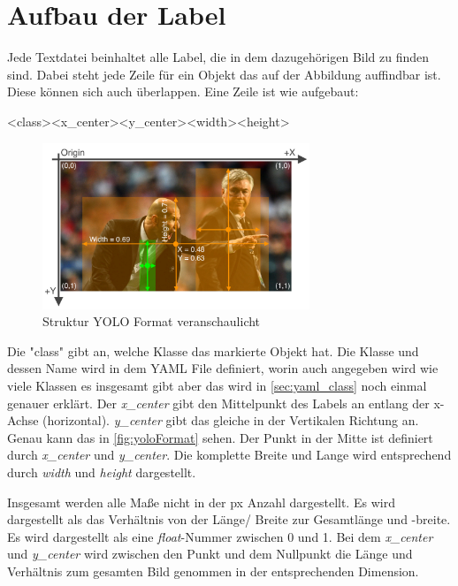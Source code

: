 \section{Aufbau der Label}
Jede Textdatei beinhaltet alle Label, die in dem dazugehörigen Bild zu finden sind. Dabei steht jede Zeile für ein Objekt das auf der Abbildung auffindbar ist. Diese können sich auch überlappen. Eine Zeile ist wie aufgebaut:
\begin{tcolorbox}
    \textless class\textgreater\space \textless x\_center\textgreater \space \textless y\_center\textgreater \space\textless width\textgreater \space\textless height\textgreater 
\end{tcolorbox}
\begin{figure}
    \begin{center}
        \includegraphics[width=8cm]{data/img/yolo_picture_structure.png}    
        \caption{Struktur YOLO Format veranschaulicht}
        \label{fig:yoloFormat}
    \end{center}
\end{figure}
Die "class" gibt an, welche Klasse das markierte Objekt hat. Die Klasse und dessen Name wird in dem YAML File definiert, worin auch angegeben wird wie viele Klassen es insgesamt gibt aber das wird in \autoref{sec:yaml_class} noch einmal genauer erklärt. Der \textit{x\_center} gibt den Mittelpunkt des Labels an entlang der x-Achse (horizontal). \textit{y\_center} gibt das gleiche in der Vertikalen Richtung an. Genau kann das in \autoref{fig:yoloFormat} sehen. Der Punkt in der Mitte ist definiert durch \textit{x\_center} und \textit{y\_center}. Die komplette Breite und Lange wird entsprechend durch \textit{width} und \textit{height} dargestellt. 

Insgesamt werden alle Maße nicht in der px Anzahl dargestellt. Es wird dargestellt als das Verhältnis von der Länge/ Breite zur Gesamtlänge und -breite. Es wird dargestellt als eine \textit{float}-Nummer zwischen 0 und 1. Bei dem \textit{x\_center} und \textit{y\_center} wird zwischen den Punkt und dem Nullpunkt die Länge und Verhältnis zum gesamten Bild genommen in der entsprechenden Dimension. 

